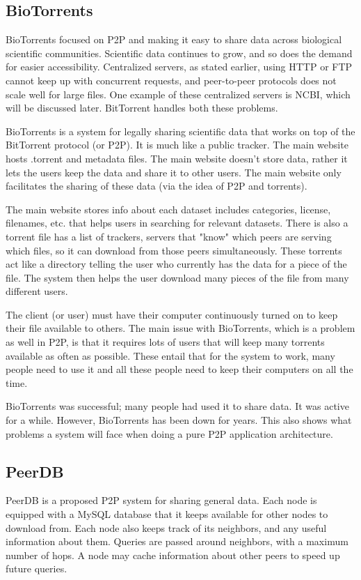 \documentclass[acmsmall]{acmart}
\begin{document}
\subsection{BioTorrents}
BioTorrents focused on P2P and making it easy to share data across biological scientific communities.  Scientific data continues to grow, and so does the demand for easier accessibility. Centralized servers, as stated earlier, using HTTP or FTP cannot keep up with concurrent requests, and peer-to-peer protocols does not scale well for large files.\cite{biotorrents} One example of these centralized servers is NCBI, which will be discussed later. BitTorrent handles both these problems. 

BioTorrents is a system for legally sharing scientific data that works on top of the BitTorrent protocol (or P2P). It is much like a public tracker. The main website hosts .torrent and metadata files. The main website doesn't store data, rather it lets the users keep the data and share it to other users. The main website only facilitates the sharing of these data (via the idea of P2P and torrents).

The main website stores info about each dataset includes categories, license, filenames, etc. that helps users in searching for relevant datasets. There is also a torrent file has a list of trackers, servers that "know" which peers are serving which files, so it can download from those peers simultaneously. These torrents act like a directory telling the user who currently has the data for a piece of the file. The system then helps the user download many pieces of the file from many different users.

The client (or user) must have their computer continuously turned on to keep their file available to others. The main issue with BioTorrents, which is a problem as well in P2P, is that it requires lots of users that will keep many torrents available as often as possible.\cite{biotorrents} These entail that for the system to work, many people need to use it and all these people need to keep their computers on all the time.

BioTorrents was successful; many people had used it to share data. It was active for a while. However, BioTorrents has been down for years. This also shows what problems a system will face when doing a pure P2P application architecture.

\subsection{PeerDB}
PeerDB is a proposed P2P system for sharing general data. Each node is equipped with a MySQL database that it keeps available for other nodes to download from. Each node also keeps track of its neighbors, and any useful information about them. Queries are passed around neighbors, with a maximum number of hops. A node may cache information about other peers to speed up future queries.
\cite{peerdb}
\end{document}
